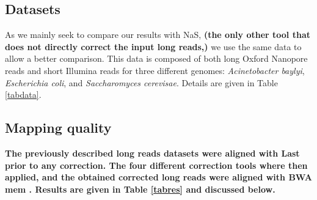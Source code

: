 \documentclass[long, final]{jobim2017}
\begin{document}
\subsection{Datasets}

As we mainly seek to compare our results with NaS, \textbf{(the only other tool that does not directly correct the input long reads,)} we use the same data to allow a better comparison. This data is composed of both long Oxford Nanopore reads and short Illumina reads for three different genomes: \emph{Acinetobacter baylyi}, \emph{Escherichia coli}, and \emph{Saccharomyces cerevisae}. Details are given in Table \ref{tabdata}.

\begin{table}[ht]
	\begin{center}
	\end{center}
	\caption{Description of the datasets used in our experiments. \label{tabdata} Both MinION and Illumina data are
	available from the Genoscope website http://www.genoscope.cns.fr/externe/nas/datasets.html \textbf{TODO :
	MinION coverage \`a revoir.}}
\end{table}

\subsection{Mapping quality}

\textbf{The previously described long reads datasets were aligned with Last prior to any correction. The four different correction tools where then applied, and the obtained corrected long reads were aligned with BWA mem \cite{Li2010b}. Results are given in Table \ref{tabres} and discussed below.}
\end{document}
